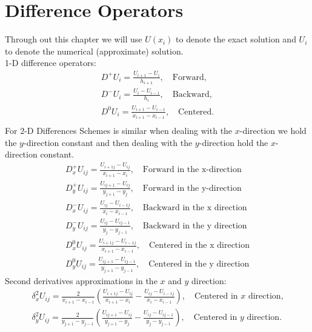 \section{Difference Operators}
Through out this chapter we will use $U(x_i)$ to denote the exact solution and 
$U_i$ to denote the numerical (approximate) solution.\\
1-D difference operators:
\begin{eqnarray*}
D^{+}U_{i}=\frac{U_{i+1}-U_{i}}{h_{i+1}}, \ \ \ \mbox{ Forward,} \\
D^{-}U_{i}=\frac{U_{i}-U_{i-1}}{h_i}, \ \ \ \mbox{ Backward,} \\
D^{0}U_{i}=\frac{U_{i+1}-U_{i-1}}{x_{i+1}-x_{i-1}}, \ \ \ \mbox{ Centered.} \\
\end{eqnarray*}
For $2$-D Differences Schemes is similar when dealing with the $x$-direction we hold
the $y$-direction constant and then dealing with the $y$-direction hold the $x$-direction
constant.
\begin{eqnarray*}
D^{+}_xU_{ij}=\frac{U_{i+1j}-U_{ij}}{x_{i+1}-x_{i}}, \ \ \ \mbox{ Forward in the x-direction} \\
D^{+}_yU_{ij}=\frac{U_{ij+1}-U_{ij}}{y_{j+1}-y_{j}}, \ \ \ \mbox{ Forward in the y-direction} \\
D^{-}_xU_{ij}=\frac{U_{ij}-U_{i-1j}}{x_i-x_{i-1}}, \ \ \ \mbox{ Backward in the x direction} \\
D^{-}_yU_{ij}=\frac{U_{ij}-U_{ij-1}}{y_j-y_{j-1}}, \ \ \ \mbox{ Backward in the y direction} \\
D^{0}_xU_{ij}=\frac{U_{i+1j}-U_{i-1j}}{x_{i+1}-x_{i-1}}, \ \ \ \mbox{ Centered in the x direction} \\
D^{0}_yU_{ij}=\frac{U_{ij+1}-U_{ij-1}}{y_{j+1}-y_{j-1}}, \ \ \ \mbox{ Centered in the y direction} 
\end{eqnarray*}
Second derivatives approximations in the $x$ and $y$ direction:
\begin{eqnarray*}
\delta_x^{2}U_{ij}=\frac{2}{x_{i+1}-x_{i-1}}\left(\frac{U_{i+1j}-U_{ij}}{x_{i+1}-x_{i}}-\frac{U_{ij}-U_{i-1j}}{x_{i}-x_{i-1}}\right), \ \ \ \mbox{ Centered in $x$ direction,} \\
\delta_y^{2}U_{ij}=\frac{2}{y_{j+1}-y_{j-1}}\left(\frac{U_{ij+1}-U_{ij}}{y_{j+1}-y_{j}}-\frac{U_{ij}-U_{ij-1}}{y_{j}-y_{j-1}}\right), \ \ \ \mbox{ Centered in $y$ direction.} \\
\end{eqnarray*}
